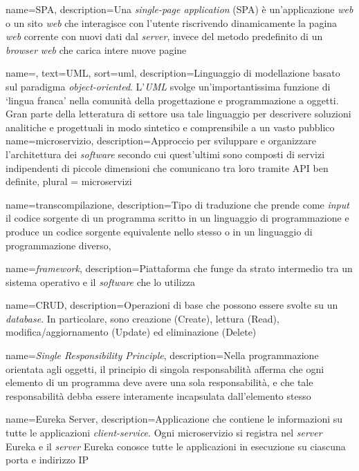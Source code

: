 {
    name=SPA,
    description={Una \textit{single-page application} (SPA) è un'applicazione \textit{web} o un sito \textit{web} che interagisce con l'utente riscrivendo dinamicamente la pagina \textit{web} corrente con nuovi dati dal \textit{server}, invece del metodo predefinito di un \textit{browser} \textit{web} che carica intere nuove pagine}
}

{
    name=,
    text=UML,
    sort=uml,
    description={Linguaggio di modellazione basato sul paradigma \textit{object-oriented}. L'\emph{UML} svolge un'importantissima funzione di \enquote*{lingua franca} nella comunità della progettazione e programmazione a oggetti. Gran parte della letteratura di settore usa tale linguaggio per descrivere soluzioni analitiche e progettuali in modo sintetico e comprensibile a un vasto pubblico}
}
{
    name={microservizio},
    description={Approccio per sviluppare e organizzare l'architettura dei \textit{software} secondo cui quest’ultimi sono composti di servizi indipendenti di piccole dimensioni che comunicano tra loro tramite \gls{API} ben definite},
    plural = {microservizi}
}

{
    name={transcompilazione},
    description={Tipo di traduzione 
    che prende come \textit{input} il codice sorgente di un programma scritto in un linguaggio di programmazione e produce un codice sorgente equivalente nello stesso o in un linguaggio di programmazione diverso},
}


{
    name={\textit{framework}},
    description={Piattaforma che funge da strato intermedio tra un sistema operativo e il \textit{software} che lo utilizza}
}


{
    name={CRUD},
    description={Operazioni di base che possono essere svolte su un \textit{database}. In particolare,
    sono creazione (Create), lettura (Read), modifica/aggiornamento (Update) ed
    eliminazione (Delete)}
}


{
    name=\textit{Single Responsibility Principle},
    description={Nella programmazione orientata agli oggetti, il principio di singola responsabilità afferma che ogni elemento di un programma deve avere una sola responsabilità, e che tale responsabilità debba essere interamente incapsulata dall'elemento stesso}
}

{
    name={Eureka Server},
    description={Applicazione che contiene le informazioni su tutte le applicazioni \textit{client-service}. Ogni \gls{microservizio} si registra nel \textit{server} Eureka e il \textit{server} Eureka conosce tutte le applicazioni in esecuzione su ciascuna porta e indirizzo \gls{IP}}
}


